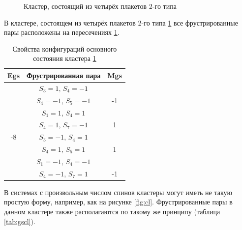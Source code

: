 \documentclass[utf8, babel, sor, jor, amsmath, amssymb, reprint]{elsarticle} %
\begin{document}
\begin{figure}[H]
	\centering
	\caption{Кластер, состоящий из четырёх плакетов 2-го типа}
	\label{fig:3x3}
\end{figure}

В кластере, состоящем из четырёх плакетов 2-го типа \ref{fig:3x3} все фрустрированные пары расположены на пересечениях \ref{tab:gs_3x3}.

\begin{table}[H]
	\centering
	\begin{tabular}{|c|c|c|}
		\hline
		Egs   &   Фрустрированная пара & Mgs\\
		\hline
		&  $S_3=1$, $S_4=-1$&\\
		&    $S_4=-1$, $S_5=-1$ & -1\\
		\cline{2-3}
		&  $S_1=1$, $S_4=1$&\\
		&    $S_4=1$, $S_7=-1$ & 1\\
		\cline{2-3}
		-8	\multirow{3}{*}{}
		&  $S_3=-1$, $S_4=1$&\\
		&    $S_4=1$, $S_5=1$& 1\\
		\cline{2-3}
		&  $S_1=-1$, $S_4=-1$&\\
		&    $S_4=-1$, $S_7=1$& -1\\
		\hline
	\end{tabular}
	\caption{Свойства конфигураций основного состояния кластера \ref{fig:3x3}}
	\label{tab:gs_3x3}
\end{table} 

В системах с произвольным числом спинов кластеры могут иметь не такую простую форму, например, как на рисунке \ref{fig:cl}. Фрустрированные пары в данном кластере также располагаются по такому же принципу (таблица \ref{tab:gscl}).
\end{document}
